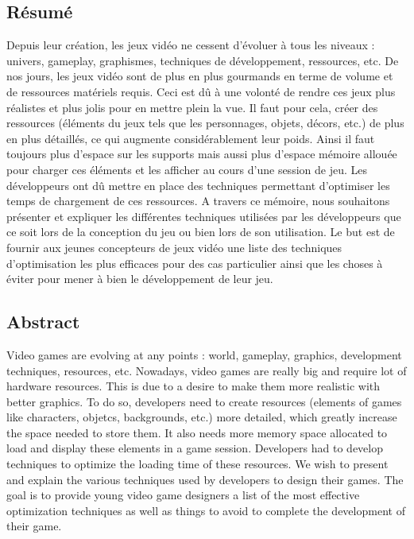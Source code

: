 \documentclass[a4paper, 12pt]{article} %
\begin{document}
\subsection{Résumé}
Depuis leur création, les jeux vidéo ne cessent d'évoluer à tous les niveaux : univers, gameplay, graphismes, techniques de développement, ressources, etc. De nos jours, les jeux vidéo sont de plus en plus gourmands en terme de volume et de ressources matériels requis. Ceci est dû à une volonté de rendre ces jeux plus réalistes et plus jolis pour en mettre plein la vue. Il faut pour cela, créer des ressources (éléments du jeux tels que les personnages, objets, décors, etc.) de plus en plus détaillés, ce qui augmente considérablement leur poids. Ainsi il faut toujours plus d'espace sur les supports mais aussi plus d'espace mémoire allouée pour charger ces éléments et les afficher au cours d'une session de jeu. Les développeurs ont dû mettre en place des techniques permettant d'optimiser les temps de chargement de ces ressources. A travers ce mémoire, nous souhaitons présenter et expliquer les différentes techniques utilisées par les développeurs que ce soit lors de la conception du jeu ou bien lors de son utilisation. Le but est de fournir aux jeunes concepteurs de jeux vidéo une liste des techniques d'optimisation les plus efficaces pour des cas particulier ainsi que les choses à éviter pour mener à bien le développement de leur jeu.

\subsection{Abstract}
Video games are evolving at any points : world, gameplay, graphics, development techniques, resources, etc. Nowadays, video games are really big and require lot of hardware resources. This is due to a desire to make them more realistic with better graphics. To do so, developers need to create resources (elements of games like characters, objetcs, backgrounds, etc.) more detailed, which greatly increase the space needed to store them. It also needs more memory space allocated to load and display these elements in a game session. Developers had to develop techniques to optimize the loading time of these resources. We wish to present and explain the various techniques used by developers to design their games. The goal is to provide young video game designers a list of the most effective optimization techniques as well as things to avoid to complete the development of their game.
\end{document}
